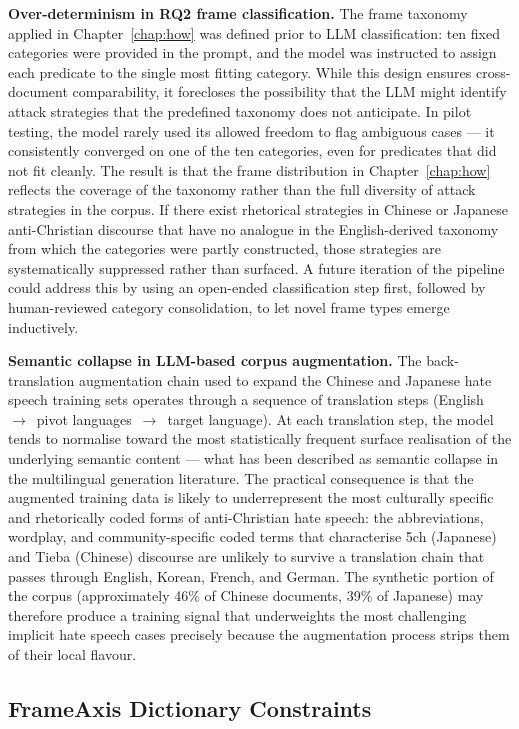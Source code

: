 \documentclass[../CLthesis.tex]{subfiles}
\begin{document}
\textbf{Over-determinism in RQ2 frame classification.} The frame taxonomy applied in Chapter~\ref{chap:how} was defined prior to LLM classification: ten fixed categories were provided in the prompt, and the model was instructed to assign each predicate to the single most fitting category. While this design ensures cross-document comparability, it forecloses the possibility that the LLM might identify attack strategies that the predefined taxonomy does not anticipate. In pilot testing, the model rarely used its allowed freedom to flag ambiguous cases --- it consistently converged on one of the ten categories, even for predicates that did not fit cleanly. The result is that the frame distribution in Chapter~\ref{chap:how} reflects the coverage of the taxonomy rather than the full diversity of attack strategies in the corpus. If there exist rhetorical strategies in Chinese or Japanese anti-Christian discourse that have no analogue in the English-derived taxonomy from which the categories were partly constructed, those strategies are systematically suppressed rather than surfaced. A future iteration of the pipeline could address this by using an open-ended classification step first, followed by human-reviewed category consolidation, to let novel frame types emerge inductively.

\textbf{Semantic collapse in LLM-based corpus augmentation.} The back-translation augmentation chain used to expand the Chinese and Japanese hate speech training sets operates through a sequence of translation steps (English~$\to$~pivot languages~$\to$~target language). At each translation step, the model tends to normalise toward the most statistically frequent surface realisation of the underlying semantic content --- what has been described as semantic collapse in the multilingual generation literature. The practical consequence is that the augmented training data is likely to underrepresent the most culturally specific and rhetorically coded forms of anti-Christian hate speech: the abbreviations, wordplay, and community-specific coded terms that characterise 5ch (Japanese) and Tieba (Chinese) discourse are unlikely to survive a translation chain that passes through English, Korean, French, and German. The synthetic portion of the corpus (approximately 46\% of Chinese documents, 39\% of Japanese) may therefore produce a training signal that underweights the most challenging implicit hate speech cases precisely because the augmentation process strips them of their local flavour.

\subsection{FrameAxis Dictionary Constraints}
\end{document}
